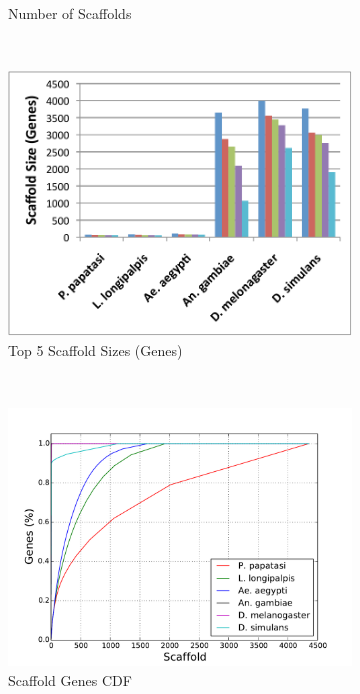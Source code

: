 \begin{figure}[H]
\begin{subfigure}[b]{0.45\textwidth}
    \caption{Number of Scaffolds}
    \label{fig:number-scaffolds}
  \end{subfigure}
  ~
  \begin{subfigure}[b]{0.45\textwidth}
    \includegraphics[width=\textwidth]{figures/synteny/top5_scaffold_sizes.pdf}
    \caption{Top 5 Scaffold Sizes (Genes)}
  \end{subfigure}
  ~
  \begin{subfigure}[b]{0.45\textwidth}
    \includegraphics[width=\textwidth]{figures/synteny/gene_scaffold_cdf.pdf}
    \caption{Scaffold Genes CDF}
  \end{subfigure}
  \label{fig:scaffolds}
  \caption{}
\end{figure}

